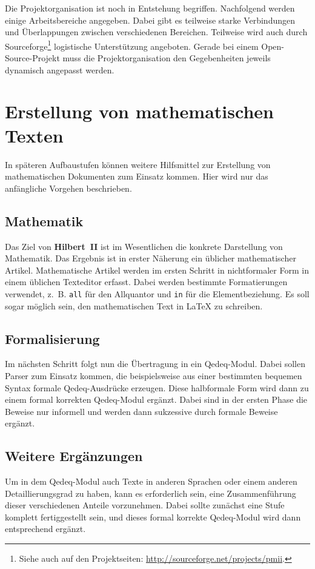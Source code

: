 \documentclass[a4paper,german,10pt,twoside]{book}
\begin{document}
{Die Projektorganisation ist noch in Entstehung begriffen. Nachfolgend werden einige Arbeitsbereiche
angegeben. Dabei gibt es teilweise starke Verbindungen und {\"U}berlappungen zwischen verschiedenen
Bereichen. Teilweise wird auch durch Sourceforge\footnote{Siehe auch auf den Projektseiten:
\url{http://sourceforge.net/projects/pmii}.} logistische Unterst{\"u}tzung angeboten. Gerade bei einem
Open-Source-Projekt muss die Projektorganisation den Gegebenheiten jeweils dynamisch angepasst
werden.

\section{Erstellung von mathematischen Texten}
In sp{\"a}teren Aufbaustufen k{\"o}nnen weitere Hilfsmittel zur Erstellung von mathematischen Dokumenten
zum Einsatz kommen. Hier wird nur das anf{\"a}ngliche Vorgehen beschrieben.

\subsection{Mathematik}
Das Ziel von \textbf{Hilbert~II} ist im Wesentlichen die konkrete Darstellung von Mathematik. Das
Ergebnis ist in erster N{\"a}herung ein {\"u}blicher mathematischer Artikel. Mathematische Artikel werden
im ersten Schritt in nichtformaler Form in einem {\"u}blichen Texteditor erfasst. Dabei werden
bestimmte Formatierungen verwendet, z.~B. {\tt all} f{\"u}r den Allquantor und {\tt in} f{\"u}r die
Elementbeziehung. Es soll sogar m{\"o}glich sein, den mathematischen Text in \LaTeX{} zu schreiben.

\subsection{Formalisierung} Im n{\"a}chsten Schritt folgt nun die {\"U}bertragung in ein Qedeq-Modul.
Dabei sollen Parser zum Einsatz kommen, die beispielsweise aus einer bestimmten bequemen Syntax
formale Qedeq-Ausdr{\"u}cke erzeugen. Diese halbformale Form wird dann zu einem formal korrekten
Qedeq-Modul erg{\"a}nzt. Dabei sind in der ersten Phase die Beweise nur informell und werden dann
sukzessive durch formale Beweise erg{\"a}nzt.

\subsection{Weitere Erg{\"a}nzungen}
Um in dem Qedeq-Modul auch Texte in anderen Sprachen oder einem anderen Detaillierungsgrad zu
haben, kann es erforderlich sein, eine Zusammenf{\"u}hrung dieser verschiedenen Anteile vorzunehmen.
Dabei sollte zun{\"a}chst eine Stufe komplett fertiggestellt sein, und dieses formal korrekte
Qedeq-Modul wird dann entsprechend erg{\"a}nzt.

}
\end{document}
